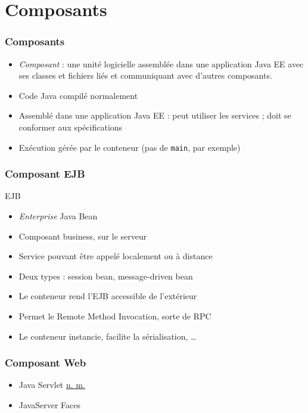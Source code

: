 \documentclass[english, french]{beamer}
\begin{document}
\section{Composants}
\begin{frame}
	\frametitle{Composants}
	\begin{itemize}
		\item \emph{Composant} : une unité logicielle assemblée dans une application Java EE avec ses classes et fichiers liés et communiquant avec d’autres composants.
		\item Code Java compilé normalement
		\item Assemblé dans une application Java EE : peut utiliser les services ; doit se conformer aux spécifications
		\item Exécution gérée par le conteneur (pas de \texttt{main}, par exemple)
	\end{itemize}
\end{frame}

\begin{frame}
	\frametitle{Composant EJB}
	\begin{block}{EJB}
		\begin{itemize}
			\item \emph{Enterprise} Java Bean
			\item Composant \og{}business\fg{}, sur le serveur
			\item Service pouvant être appelé localement ou à distance
			\item Deux types : session bean, message-driven bean
		\end{itemize}
	\end{block}
	\begin{itemize}
		\item Le conteneur rend l’EJB accessible de l’extérieur
		\item Permet le Remote Method Invocation, sorte de RPC
		\item Le conteneur instancie, facilite la sérialisation, …
	\end{itemize}
\end{frame}

\begin{frame}
	\frametitle{Composant Web}
	\begin{itemize}
		\item Java Servlet {\tiny \href{http://gdt.oqlf.gouv.qc.ca/ficheOqlf.aspx?Id_Fiche=8386532}{n. m.}}
		\item JavaServer Faces
	\end{itemize}
\end{frame}
\end{document}
